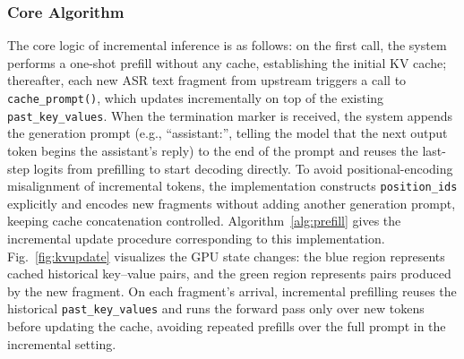 \documentclass[conference]{IEEEtran}
\begin{document}
\subsubsection{Core Algorithm}

The core logic of incremental inference is as follows: on the first call, the system performs a one-shot prefill without any cache, establishing the initial KV cache; thereafter, each new ASR text fragment from upstream triggers a call to \texttt{cache\_prompt()}, which updates incrementally on top of the existing \texttt{past\_key\_values}. When the termination marker is received, the system appends the generation prompt (e.g., ``assistant:'', telling the model that the next output token begins the assistant's reply) to the end of the prompt and reuses the last-step logits from prefilling to start decoding directly. To avoid positional-encoding misalignment of incremental tokens, the implementation constructs \texttt{position\_ids} explicitly and encodes new fragments without adding another generation prompt, keeping cache concatenation controlled. Algorithm~\ref{alg:prefill} gives the incremental update procedure corresponding to this implementation. Fig.~\ref{fig:kvupdate} visualizes the GPU state changes: the blue region represents cached historical key--value pairs, and the green region represents pairs produced by the new fragment. On each fragment's arrival, incremental prefilling reuses the historical \texttt{past\_key\_values} and runs the forward pass only over new tokens before updating the cache, avoiding repeated prefills over the full prompt in the incremental setting.
\end{document}

